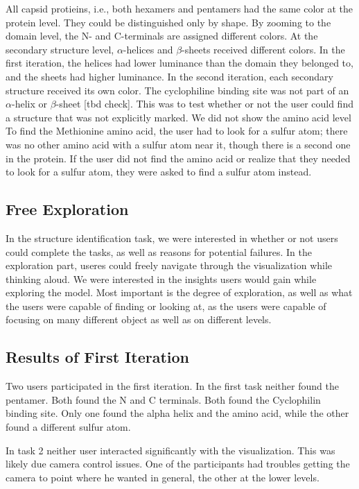 \documentclass[review,journal]{vgtc}         %
\begin{document}
All capsid protieins, i.e., both hexamers and pentamers had the same color at the protein level. They could be distinguished only by shape. By zooming to the domain level, the N- and C-terminals are assigned different colors. At the secondary structure level, $\alpha$-helices and $\beta$-sheets received different colors. In the first iteration, the helices had lower luminance than the domain they belonged to, and the sheets had higher luminance. In the second iteration, each secondary structure received its own color. 
The cyclophiline binding site was not part of an $\alpha$-helix or $\beta$-sheet [tbd check].
This was to test whether or not the user could find a structure that was not explicitly marked. 
We did not show the amino acid level
To find the Methionine amino acid, the user had to look for a sulfur atom; there was no other amino acid with a sulfur atom near it, though there is a second one in the protein. 
If the user did not find the amino acid or realize that they needed to look for a sulfur atom, they were asked to find a sulfur atom instead.





\subsection{Free Exploration}
In the structure identification task, we were interested in whether or not users could complete the tasks, as well as reasons for potential failures. 
In the exploration part, useres could freely navigate through the visualization while thinking aloud. We were interested in the insights users would gain while exploring the model.
Most important is the degree of exploration, as well as what the users were capable of finding or looking at, as the users were capable of focusing on many different object as well as on different levels.


\subsection{Results of First Iteration}
Two users participated in the first iteration. 
In the first task neither found the pentamer. 
Both found the N and C terminals. 
Both found the Cyclophilin binding site. 
Only one found the alpha helix and the amino acid, while the other found a different sulfur atom.

In task 2 neither user interacted significantly with the visualization. This was likely due camera control issues. 
One of the participants had troubles getting the camera to point where he wanted in general, the other at the lower levels.
\end{document}
